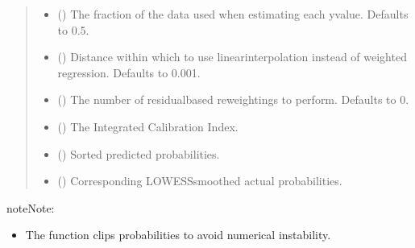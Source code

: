 \documentclass[letterpaper,10pt,english]{sphinxmanual}
\begin{document}
\begin{fulllineitems}
\begin{quote}
\begin{description}
\begin{itemize}
\item {} 
\sphinxAtStartPar
{} (\sphinxstyleliteralemphasis{\sphinxupquote{, }}) \textendash{} The fraction of the data used when estimating each y\sphinxhyphen{}value. Defaults to 0.5.

\item {} 
\sphinxAtStartPar
{} (\sphinxstyleliteralemphasis{\sphinxupquote{, }}) \textendash{} Distance within which to use linear\sphinxhyphen{}interpolation instead of weighted regression. Defaults to 0.001.

\item {} 
\sphinxAtStartPar
{} (\sphinxstyleliteralemphasis{\sphinxupquote{, }}) \textendash{} The number of residual\sphinxhyphen{}based reweightings to perform. Defaults to 0.

\end{itemize}

\begin{itemize}
\item {} 
\sphinxAtStartPar
{} () \textendash{} The Integrated Calibration Index.

\item {} 
\sphinxAtStartPar
{} () \textendash{} Sorted predicted probabilities.

\item {} 
\sphinxAtStartPar
{} () \textendash{} Corresponding LOWESS\sphinxhyphen{}smoothed actual probabilities.

\end{itemize}

\end{description}\end{quote}

\begin{sphinxadmonition}{note}{Note:}\begin{itemize}
\item {} 
\sphinxAtStartPar
The function clips probabilities to avoid numerical instability.


\end{itemize}
\end{sphinxadmonition}
\end{fulllineitems}
\end{document}
